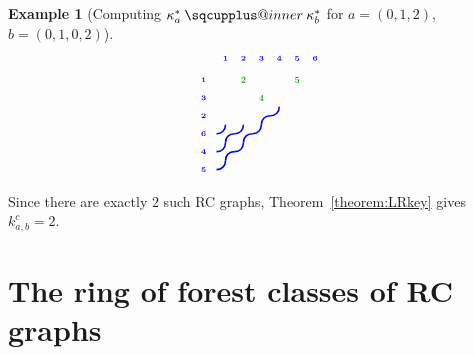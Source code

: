 \documentclass{amsart}
\makeatletter
\newcommand{\sqcupplus@inner}[2]{%
  \vcenter{\hbox{\ooalign{%
    \hfil$\m@th#1\sqcup$\hfil\cr
    \hfil\raisebox{0.15ex}{$\m@th#1\scriptscriptstyle+$}\hfil\cr
  }}}%
}
\newcommand{\sqcupplus}{\mathbin{\mathpalette\sqcupplus@inner\relax}}
\theoremstyle{definition}
\newtheorem{example}[lemma]{Example}
\theoremstyle{remark}
\numberwithin{equation}{subsection}
\makeatother
\begin{document}
\begin{example}[Computing $\kappa_a^*\sqcupplus\kappa_b^*$ for $a=(0,1,2)$, $b=(0,1,0,2)$]
$$\begin{tikzpicture}[scale=0.45, baseline=(current bounding box.center)]
  \draw[blue, line width=1.125pt] (2.8,3) .. controls (2.8,3.3) and (3,3.5) .. (3.3,3.5);
  \draw[blue, line width=1.125pt] (3.3,3.5) .. controls (3.6,3.5) and (3.8,3.7) .. (3.8,4);
  \draw[blue, line width=1.125pt] (0.3,2.5) .. controls (0.6,2.5) and (0.8,2.7) .. (0.8,3);
  \draw[blue, line width=1.125pt] (0.8,2) .. controls (0.8,2.3) and (1,2.5) .. (1.3,2.5);
  \draw[blue, line width=1.125pt] (1.3,2.5) .. controls (1.6,2.5) and (1.8,2.7) .. (1.8,3);
  \draw[blue, line width=1.125pt] (1.8,2) .. controls (1.8,2.3) and (2,2.5) .. (2.3,2.5);
  \draw[blue, line width=1.125pt] (2.3,2.5) .. controls (2.6,2.5) and (2.8,2.7) .. (2.8,3);
  \draw[blue, line width=1.125pt] (0.3,1.5) .. controls (0.6,1.5) and (0.8,1.7) .. (0.8,2);
  \draw[blue, line width=1.125pt] (0.8,1) .. controls (0.8,1.3) and (1,1.5) .. (1.3,1.5);
  \draw[blue, line width=1.125pt] (1.3,1.5) .. controls (1.6,1.5) and (1.8,1.7) .. (1.8,2);
  \draw[blue, line width=1.125pt] (0.3,0.5) .. controls (0.6,0.5) and (0.8,0.7) .. (0.8,1);
  \node[font=\tiny\bfseries, text=blue, anchor=south] at (0.8,6.3) {1};
  \node[font=\tiny\bfseries, text=blue, anchor=south] at (1.8,6.3) {2};
  \node[font=\tiny\bfseries, text=blue, anchor=south] at (2.8,6.3) {3};
  \node[font=\tiny\bfseries, text=blue, anchor=south] at (3.8,6.3) {4};
  \node[font=\tiny\bfseries, text=blue, anchor=south] at (4.8,6.3) {5};
  \node[font=\tiny\bfseries, text=blue, anchor=south] at (5.8,6.3) {6};
  \node[font=\tiny\bfseries, text=blue, anchor=east] at (0,5.5) {1};
  \node[font=\tiny\bfseries, text=blue, anchor=east] at (0,4.5) {3};
  \node[font=\tiny\bfseries, text=blue, anchor=east] at (0,3.5) {2};
  \node[font=\tiny\bfseries, text=blue, anchor=east] at (0,2.5) {6};
  \node[font=\tiny\bfseries, text=blue, anchor=east] at (0,1.5) {4};
  \node[font=\tiny\bfseries, text=blue, anchor=east] at (0,0.5) {5};
  \node[font=\Large\bfseries, text=green!60!black, fill=white, inner sep=0.5pt, circle, transform shape] at (1.8,5.5) {2};
  \node[font=\Large\bfseries, text=green!60!black, fill=white, inner sep=0.5pt, circle, transform shape] at (4.8,5.5) {5};
  \node[font=\Large\bfseries, text=green!60!black, fill=white, inner sep=0.5pt, circle, transform shape] at (2.8,4.5) {4};
\end{tikzpicture}
$$

Since there are exactly $2$ such RC graphs, Theorem~\ref{theorem:LRkey} gives $k_{a,b}^c = 2$.
\end{example}



\section{The ring of forest classes of RC graphs}\label{section:forest}
\end{document}
